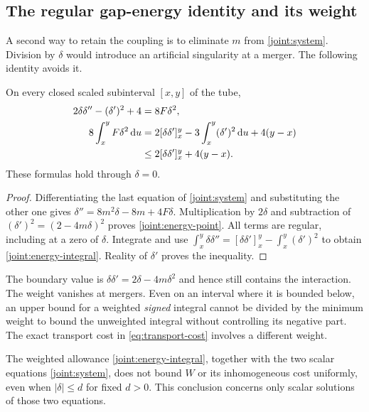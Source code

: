 \subsection{The regular gap-energy identity and its weight}

A second way to retain the coupling is to eliminate $m$ from
\eqref{joint:system}. Division by $\delta$ would introduce an artificial
singularity at a merger. The following identity avoids it.

\begin{proposition}\label{joint:energy-prop}
On every closed scaled subinterval $[x,y]$ of the tube,
\begin{align}
 2\delta\delta''-(\delta')^2+4&=8F\delta^2,
       \label{joint:energy-point}\\
 8\int_x^yF\delta^2\,\mathrm d u
 &=2[\delta\delta']_x^y-3\int_x^y(\delta')^2\,\mathrm d u+4(y-x)
       \label{joint:energy-integral}\\
 &\le2[\delta\delta']_x^y+4(y-x).\notag
\end{align}
These formulas hold through $\delta=0$.
\end{proposition}

\begin{proof}
Differentiating the last equation of \eqref{joint:system} and substituting
the other one gives
$\delta''=8m^2\delta-8m+4F\delta$.
Multiplication by $2\delta$ and subtraction of
$(\delta')^2=(2-4m\delta)^2$ proves \eqref{joint:energy-point}.
All terms are regular, including at a zero of $\delta$.
Integrate and use
$\int_x^y\delta\delta''=[\delta\delta']_x^y-
\int_x^y(\delta')^2$ to obtain \eqref{joint:energy-integral}.
Reality of $\delta'$ proves the inequality.
\end{proof}

The boundary value is $\delta\delta'=2\delta-4m\delta^2$ and hence
still contains the interaction. The weight vanishes at mergers.
Even on an interval where it is bounded below, an upper bound for a
weighted \emph{signed} integral cannot be divided by the minimum weight
to bound the unweighted integral without controlling its negative part.
The exact transport cost in \eqref{eq:transport-cost} involves a different
weight.

\begin{proposition}
\label{joint:scalar-screen}
The weighted allowance \eqref{joint:energy-integral}, together with the
two scalar equations \eqref{joint:system}, does not bound $W$ or its
inhomogeneous cost uniformly, even when $|\delta|\le d$ for fixed $d>0$.
This conclusion concerns only scalar solutions of those two equations.
\end{proposition}

